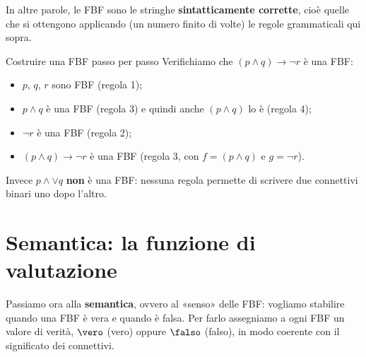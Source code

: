 In altre parole, le FBF sono le stringhe \textbf{sintatticamente corrette}, cioè quelle che si ottengono
applicando (un numero finito di volte) le regole grammaticali qui sopra.

\begin{esempio}{Costruire una FBF passo per passo}
    Verifichiamo che $(p \wedge q) \rightarrow \neg r$ è una FBF:
    \begin{itemize}
        \item $p$, $q$, $r$ sono FBF (regola 1);
        \item $p \wedge q$ è una FBF (regola 3) e quindi anche $(p \wedge q)$ lo è (regola 4);
        \item $\neg r$ è una FBF (regola 2);
        \item $(p \wedge q) \rightarrow \neg r$ è una FBF (regola 3, con $f = (p \wedge q)$ e $g = \neg r$).
    \end{itemize}
    Invece $p \wedge \vee q$ \textbf{non} è una FBF: nessuna regola permette di scrivere due connettivi binari uno dopo l'altro.
\end{esempio}


\section{Semantica: la funzione di valutazione}\label{sec:semantica-prop}

Passiamo ora alla \textbf{semantica}, ovvero al «senso» delle FBF: vogliamo stabilire quando una FBF è vera
e quando è falsa. Per farlo assegniamo a ogni FBF un valore di verità, $\vero$ (vero) oppure $\falso$ (falso),
in modo coerente con il significato dei connettivi.

